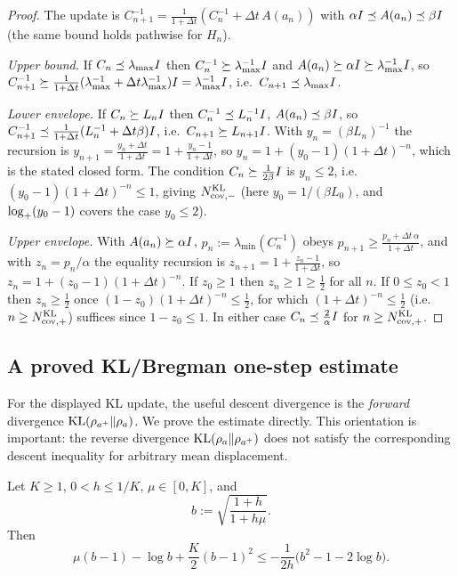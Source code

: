 \begin{proof}
The update is $C_{n+1}^{-1}=\tfrac1{1+\Delta t}(C_n^{-1}+\Delta t\,A(a_n))$ with
$\alpha I\preceq A(a_n)\preceq\beta I$ (the same bound holds pathwise for $H_n$).

\emph{Upper bound.} If $C_n\preceq\lambda_{\max}I$ then $C_n^{-1}\succeq\lambda_{\max}^{-1}I$
and $A(a_n)\succeq\alpha I\succeq\lambda_{\max}^{-1}I$, so
$C_{n+1}^{-1}\succeq\tfrac1{1+\Delta t}(\lambda_{\max}^{-1}+\Delta t\lambda_{\max}^{-1})I=\lambda_{\max}^{-1}I$,
i.e.\ $C_{n+1}\preceq\lambda_{\max}I$.

\emph{Lower envelope.} If $C_n\succeq L_nI$ then $C_n^{-1}\preceq L_n^{-1}I$,
$A(a_n)\preceq\beta I$, so $C_{n+1}^{-1}\preceq\tfrac1{1+\Delta t}(L_n^{-1}+\Delta t\beta)I$,
i.e.\ $C_{n+1}\succeq L_{n+1}I$. With $y_n=(\beta L_n)^{-1}$ the recursion is
$y_{n+1}=\tfrac{y_n+\Delta t}{1+\Delta t}=1+\tfrac{y_n-1}{1+\Delta t}$, so
$y_n=1+(y_0-1)(1+\Delta t)^{-n}$, which is the stated closed form. The condition
$C_n\succeq\tfrac1{2\beta}I$ is $y_n\leq2$, i.e.\
$(y_0-1)(1+\Delta t)^{-n}\leq1$, giving $N_{\mathrm{cov},-}^{\mathrm{KL}}$ (here $y_0=1/(\beta L_0)$,
and $\log_+(y_0-1)$ covers the case $y_0\le2$).

\emph{Upper envelope.} With $A(a_n)\succeq\alpha I$, $p_n:=\lambda_{\min}(C_n^{-1})$ obeys
$p_{n+1}\geq\tfrac{p_n+\Delta t\,\alpha}{1+\Delta t}$, and with $z_n=p_n/\alpha$ the equality
recursion is $z_{n+1}=1+\tfrac{z_n-1}{1+\Delta t}$, so $z_n=1+(z_0-1)(1+\Delta t)^{-n}$. If
$z_0\geq1$ then $z_n\geq1\geq\tfrac12$ for all $n$. If $0\leq z_0<1$ then $z_n\geq\tfrac12$
once $(1-z_0)(1+\Delta t)^{-n}\leq\tfrac12$, for which $(1+\Delta t)^{-n}\leq\tfrac12$ (i.e.\
$n\geq N_{\mathrm{cov},+}^{\mathrm{KL}}$) suffices since $1-z_0\leq1$. In either case $C_n\preceq\tfrac2\alpha I$
for $n\geq N_{\mathrm{cov},+}^{\mathrm{KL}}$.
\end{proof}


\subsection{A proved KL/Bregman one-step estimate}
\label{subsec:KL-descent}

For the displayed KL update, the useful descent divergence is the \emph{forward} divergence
$\mathrm{KL}(\rho_{a^+}\|\rho_a)$.  We prove the estimate directly.  This orientation is important:
the reverse divergence $\mathrm{KL}(\rho_a\|\rho_{a^+})$ does not satisfy the corresponding descent
inequality for arbitrary mean displacement.

\begin{lemma}
\label{lem:scalar-KL}
Let $K\geq1$, $0<h\leq1/K$, $\mu\in[0,K]$, and
\[
    b:=\sqrt{\frac{1+h}{1+h\mu}}.
\]
Then
\begin{equation}
\label{eq:scalar-KL}
    \mu(b-1)-\log b+\frac K2(b-1)^2
    \leq
    -\frac1{2h}\bigl(b^2-1-2\log b\bigr).
\end{equation}
\end{lemma}

